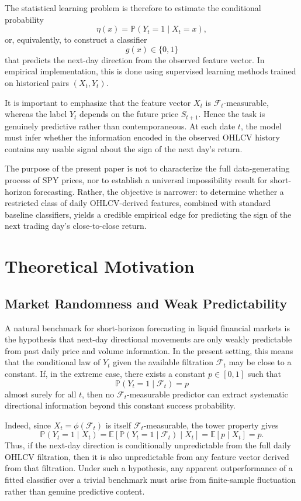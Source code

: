 \documentclass[11pt,a4paper]{article}
\begin{document}
	The statistical learning problem is therefore to estimate the conditional probability
	\[
	\eta(x) = \mathbb{P}(Y_t = 1 \mid X_t = x),
	\]
	or, equivalently, to construct a classifier
	\[
	g(x) \in \{0,1\}
	\]
	that predicts the next-day direction from the observed feature vector. In empirical implementation, this is done using supervised learning methods trained on historical pairs \((X_t, Y_t)\).
	
	It is important to emphasize that the feature vector \(X_t\) is \(\mathcal{F}_t\)-measurable, whereas the label \(Y_t\) depends on the future price \(S_{t+1}\). Hence the task is genuinely predictive rather than contemporaneous. At each date \(t\), the model must infer whether the information encoded in the observed OHLCV history contains any usable signal about the sign of the next day's return.
	
	The purpose of the present paper is not to characterize the full data-generating process of SPY prices, nor to establish a universal impossibility result for short-horizon forecasting. Rather, the objective is narrower: to determine whether a restricted class of daily OHLCV-derived features, combined with standard baseline classifiers, yields a credible empirical edge for predicting the sign of the next trading day's close-to-close return.
	
	\section{Theoretical Motivation}
	
	\subsection{Market Randomness and Weak Predictability}
	
	A natural benchmark for short-horizon forecasting in liquid financial markets is the hypothesis that next-day directional movements are only weakly predictable from past daily price and volume information. In the present setting, this means that the conditional law of \(Y_t\) given the available filtration \(\mathcal{F}_t\) may be close to a constant. If, in the extreme case, there exists a constant \(p \in [0,1]\) such that
	\[
	\mathbb{P}(Y_t = 1 \mid \mathcal{F}_t) = p
	\]
	almost surely for all \(t\), then no \(\mathcal{F}_t\)-measurable predictor can extract systematic directional information beyond this constant success probability.
	
	Indeed, since \(X_t = \phi(\mathcal{F}_t)\) is itself \(\mathcal{F}_t\)-measurable, the tower property gives
	\[
	\mathbb{P}(Y_t = 1 \mid X_t)
	= \mathbb{E}\!\left[\mathbb{P}(Y_t = 1 \mid \mathcal{F}_t)\mid X_t\right]
	= \mathbb{E}[p \mid X_t]
	= p.
	\]
	Thus, if the next-day direction is conditionally unpredictable from the full daily OHLCV filtration, then it is also unpredictable from any feature vector derived from that filtration. Under such a hypothesis, any apparent outperformance of a fitted classifier over a trivial benchmark must arise from finite-sample fluctuation rather than genuine predictive content.
	
\end{document}
